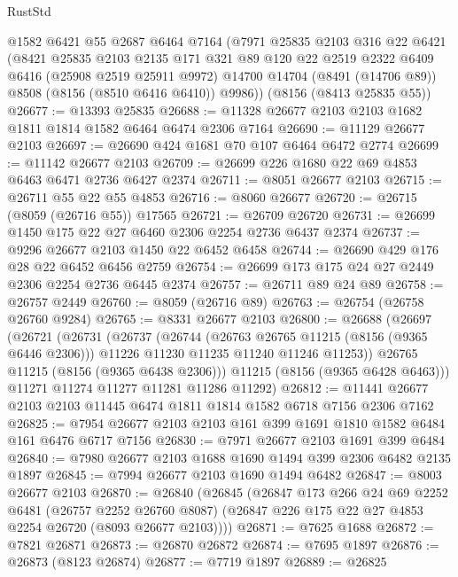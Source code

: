 \begin{lexlean}{RustStd}
\begin{coremodule}
{\begin{coremodule}
{{{{{{{{{{{{{{{{{{{{{{{{{{{{{{{{{{    @1582
    @6421
    @55
    @2687
    @6464
    @7164
    (@7971
      @25835
      @2103
      @316
      @22
      @6421
      (@8421
        @25835
        @2103
        @2135
        @171
        @321
        @89
        @120
        @22
        @2519
        @2322
        @6409
        @6416
        (@25908 @2519 @25911 @9972)
        @14700
        @14704
        (@8491 (@14706 @89))
        @8508
        (@8156 (@8510 @6416 @6410))
        @9986))
    (@8156 (@8413 @25835 @55))
@26677 := @13393 @25835
@26688 := @11328 @26677 @2103 @2103 @1682 @1811 @1814 @1582 @6464 @6474 @2306 @7164
@26690 := @11129 @26677 @2103
@26697 := @26690 @424 @1681 @70 @107 @6464 @6472 @2774
@26699 := @11142 @26677 @2103
@26709 := @26699 @226 @1680 @22 @69 @4853 @6463 @6471 @2736 @6427 @2374
@26711 := @8051 @26677 @2103
@26715 := @26711 @55 @22 @55 @4853
@26716 := @8060 @26677
@26720 := @26715 (@8059 (@26716 @55)) @17565
@26721 := @26709 @26720
@26731 := @26699 @1450 @175 @22 @27 @6460 @2306 @2254 @2736 @6437 @2374
@26737 := @9296 @26677 @2103 @1450 @22 @6452 @6458
@26744 := @26690 @429 @176 @28 @22 @6452 @6456 @2759
@26754 := @26699 @173 @175 @24 @27 @2449 @2306 @2254 @2736 @6445 @2374
@26757 := @26711 @89 @24 @89
@26758 := @26757 @2449
@26760 := @8059 (@26716 @89)
@26763 := @26754 (@26758 @26760 @9284)
@26765 := @8331 @26677 @2103
@26800 := @26688
    (@26697
      (@26721
        (@26731
          (@26737
            (@26744
              (@26763 @26765 @11215 (@8156 (@9365 @6446 @2306)))
              @11226
              @11230
              @11235
              @11240
              @11246
              @11253))
          @26765
          @11215
          (@8156 (@9365 @6438 @2306)))
        @11215
        (@8156 (@9365 @6428 @6463)))
      @11271
      @11274
      @11277
      @11281
      @11286
      @11292)
@26812 := @11441 @26677 @2103 @2103 @11445 @6474 @1811 @1814 @1582 @6718 @7156 @2306 @7162
@26825 := @7954 @26677 @2103 @2103 @161 @399 @1691 @1810 @1582 @6484 @161 @6476 @6717 @7156
@26830 := @7971 @26677 @2103 @1691 @399 @6484
@26840 := @7980 @26677 @2103 @1688 @1690 @1494 @399 @2306 @6482 @2135 @1897
@26845 := @7994 @26677 @2103 @1690 @1494 @6482
@26847 := @8003 @26677 @2103
@26870 := @26840
    (@26845
      (@26847
        @173
        @266
        @24
        @69
        @2252
        @6481
        (@26757 @2252 @26760 @8087)
        (@26847 @226 @175 @22 @27 @4853 @2254 @26720 (@8093 @26677 @2103))))
@26871 := @7625 @1688
@26872 := @7821 @26871
@26873 := @26870 @26872
@26874 := @7695 @1897
@26876 := @26873 (@8123 @26874)
@26877 := @7719 @1897
@26889 := @26825
}}}}}}}}}}}}}}}}}}}}}}}}}}}}}}}}}}
\end{coremodule}}
\end{coremodule}
\end{lexlean}
